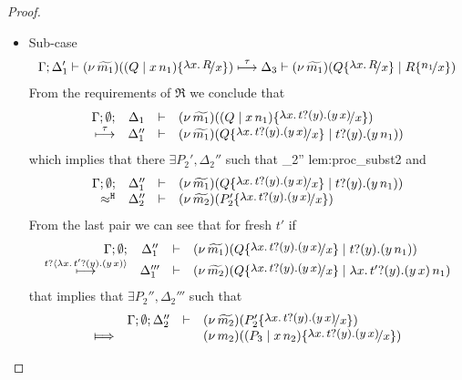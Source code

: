 \begin{proof}
\begin{enumerate}
\begin{itemize}
					\item	Sub-case 
							\begin{eqnarray}
								\horel{\Gamma}{\Delta_1'}{\newsp{\widetilde{m_1}}{(Q \Par \appl{x}{n_1}) \subst{{\abs{x}{R}}}{x} }}
								{\hby{\tau}}
								{\Delta_3}{\newsp{\widetilde{m_1}}{Q \subst{{\abs{x}{R}}}{x} \Par R \subst{n_1}{x}  }}
								\label{lem:proc_subst1}
							\end{eqnarray}
							From the requirements of $\Re$ we conclude that 
							\begin{eqnarray*}
								\mhorel{\Gamma}{\Delta_1}{\newsp{\widetilde{m_1}}{(Q \Par \appl{x}{n_1}) \subst{\trvalx{t}}{x} }}
								{\hby{\tau}}
								{\Delta_1''}{}{\newsp{\widetilde{m_1}}{Q \subst{\trvalx{t}}{x} \Par \binp{t}{y} (\appl{y}{n_1})}}
							\end{eqnarray*}
							which implies that there $\exists P_2', \Delta_2''$ such that
								{\Hby{}}
								{\Delta_2''}{}
								{lem:proc_subst2}
							and
							\begin{eqnarray*}
								\mhorel{\Gamma}{\Delta_1''}{\newsp{\widetilde{m_1}}{Q \subst{\trvalx{t}}{x} \Par \binp{t}{y} (\appl{y}{n_1})}}
								{\hwb}
								{\Delta_2''}{}{\newsp{\widetilde{m_2}}{P_2' \subst{\trvalx{t}}{x}}}
							\end{eqnarray*}
							From the last pair we can see that for fresh $t'$ if
							\begin{eqnarray*}
								\mhorel{\Gamma}{\Delta_1''}{\newsp{\widetilde{m_1}}{Q \subst{\trvalx{t}}{x} \Par \binp{t}{y} (\appl{y}{n_1})}}
								{\hby{\bactinp{t}{\trvalx{t'}}}}
								{\Delta_1'''}{}{\newsp{\widetilde{m_2}}{Q \subst{\trvalx{t}}{x} \Par \appl{\trvalx{t'}}{n_1}}}
							\end{eqnarray*}
							that implies that $\exists P_2'', \Delta_2'''$ such that
							\begin{eqnarray}
								\begin{array}{crll}
											& \Gamma; \es; \Delta_2'' &\proves& \newsp{\widetilde{m_2}}{P_2'\subst{\trvalx{t}}{x}}
									\\
									\Hby{}	&	&&	\newsp{m_2}{(P_3 \Par \appl{x}{n_2}) \subst{\trvalx{t}}{x}}

\end{array}
\end{eqnarray}
\end{itemize}
\end{enumerate}
\end{proof}
